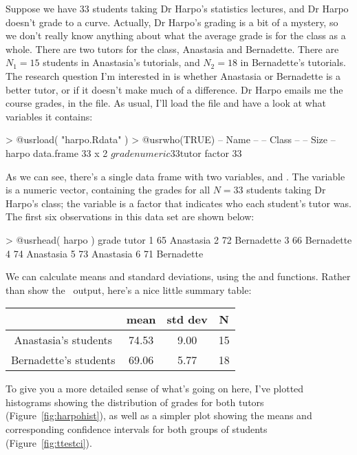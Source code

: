 
Suppose we have 33 students taking Dr Harpo's statistics lectures, and Dr Harpo doesn't grade to a curve. Actually, Dr Harpo's grading is a bit of a mystery, so we don't really know anything about what the average grade is for the class as a whole. There are two tutors for the class, Anastasia and Bernadette. There are $N_1 = 15$ students in Anastasia's tutorials, and $N_2 = 18$ in Bernadette's tutorials. The research question I'm interested in is whether Anastasia or Bernadette is a better tutor, or if it doesn't make much of a difference. Dr Harpo emails me the course grades, in the  file. As usual, I'll load the file and have a look at what variables it contains:
\begin{rblock1}
> @usr{load( "harpo.Rdata" )}
> @usr{who(TRUE)}
   -- Name --   -- Class --   -- Size --
   harpo        data.frame    33 x 2    
    $grade      numeric       33        
    $tutor      factor        33      
\end{rblock1}
As we can see, there's a single data frame with two variables,  and . The  variable is a numeric vector, containing the grades for all $N = 33$ students taking Dr Harpo's class; the  variable is a factor that indicates who each student's tutor was. The first six observations in this data set are shown below:
\begin{rblock1}
> @usr{head( harpo )}
  grade      tutor
1    65  Anastasia
2    72 Bernadette
3    66 Bernadette
4    74  Anastasia
5    73  Anastasia
6    71 Bernadette
\end{rblock1}
We can calculate means and standard deviations, using the  and  functions. Rather than show the \R\ output, here's a nice little summary table:
\begin{center}
\begin{tabular}{c|ccc}
& mean & std dev & N \\ \hline
Anastasia's students  & 74.53 & 9.00 & 15 \\
Bernadette's students & 69.06 & 5.77 & 18
\end{tabular}
\end{center}
To give you a more detailed sense of what's going on here, I've plotted histograms showing the distribution of grades for both tutors (Figure~\ref{fig:harpohist}), as well as a simpler plot showing the means and corresponding confidence intervals for both groups of students (Figure~\ref{fig:ttestci}). 

